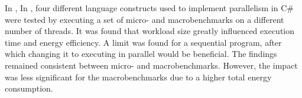 In \cite{Lindholt2022}, %
In \cite{Lindholt2022}, four different language constructs used to implement parallelism in C\# were tested by executing a set of micro- and macrobenchmarks on a different number of threads. It was found that workload size greatly influenced execution time and energy efficiency. A limit was found for a sequential program, after which changing it to executing in parallel would be beneficial. The findings remained consistent between micro- and macrobenchmarks. However, the impact was less significant for the macrobenchmarks due to a higher total energy consumption.%



